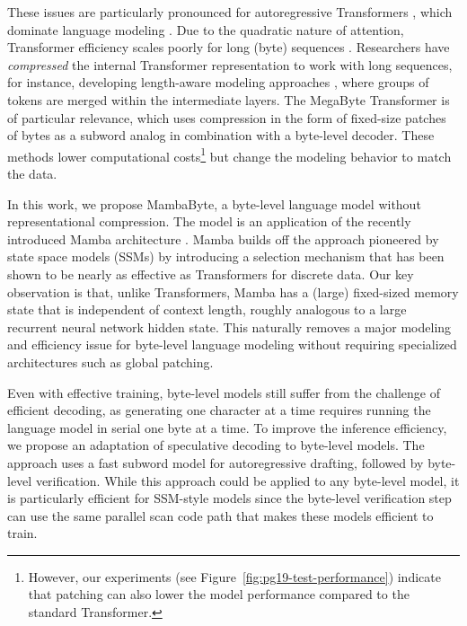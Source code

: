 These issues are particularly pronounced for autoregressive Transformers \citep{vaswani2017attention}, which dominate language modeling \citep{brown2020language,touvron2023llama2}. Due to the quadratic nature of attention, Transformer efficiency scales poorly for long (byte) sequences \citep{zhang2022opt}. Researchers have \textit{compressed} the internal Transformer representation to work with long sequences, for instance, developing length-aware modeling approaches \citep{dai2020funnel,nawrot2022hierarchical}, where groups of tokens are merged within the intermediate layers. The MegaByte Transformer \citep{yu2023megabyte} is of particular relevance, which uses compression in the form of fixed-size patches of bytes as a subword analog in combination with a byte-level decoder. These methods lower computational costs\footnote{However, our experiments (see Figure~\ref{fig:pg19-test-performance}) indicate that patching can also lower the model performance compared to the standard Transformer.} but change the modeling behavior to match the data.

In this work, we propose MambaByte, a byte-level language model without representational compression. The model is an application of the recently introduced Mamba architecture \citep{gu2023mamba}. Mamba builds off the approach pioneered by state space models (SSMs) \citep{gu2021efficiently,gupta2022diagonal,gu2022parameterization,smith2023simplified,fu2022hungry} by introducing a selection mechanism that has been shown to be nearly as effective as Transformers for discrete data. Our key observation is that, unlike Transformers, Mamba has a (large) fixed-sized memory state that is independent of context length, roughly analogous to a large recurrent neural network hidden state. This naturally removes a major modeling and efficiency issue for byte-level language modeling without requiring specialized architectures such as global patching.

Even with effective training, byte-level models still suffer from the challenge of efficient decoding, as generating one character at a time requires running the language model in serial one byte at a time. To improve the inference efficiency, we propose an adaptation of speculative decoding \citep{leviathan2023fast,chen2023accelerating,xia2023speculative} to byte-level models. The approach uses a fast subword model for autoregressive drafting, followed by byte-level verification. While this approach could be applied to any byte-level model, it is particularly efficient for SSM-style models since the byte-level verification step can use the same parallel scan code path that makes these models efficient to train.

